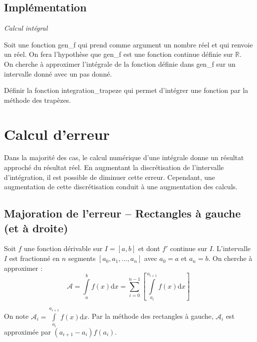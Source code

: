 \documentclass[10pt,fleqn]{article} %
\begin{document}
\begin{minipage}[c]{.38\linewidth}
\end{minipage}

\subsection{Implémentation}
\begin{exemple}
\textit{Calcul intégral}

Soit une fonction \textsf{gen\_f} qui prend comme argument un nombre réel et qui renvoie un réel. On fera l'hypothèse que \textsf{gen\_f} est une fonction continue définie sur $\mathbb{R}$. On cherche à approximer l'intégrale de la fonction définie dans \textsf{gen\_f} sur un intervalle donné avec un pas donné. 

Définir la fonction \textsf{integration\_trapeze} qui permet d'intégrer une fonction par la méthode des trapèzes.

\end{exemple}

\section{Calcul d'erreur}
Dans la majorité des cas, le calcul numérique d'une intégrale donne un résultat approché du résultat réel. En augmentant la discrétisation de l'intervalle d'intégration, il est possible de diminuer cette erreur. Cependant, une augmentation de cette discrétisation conduit à une augmentation des calculs. 


\subsection{Majoration de l'erreur -- Rectangles à gauche (et à droite)}
Soit $f$ une fonction dérivable sur $I=[a,b]$ et dont $f'$ continue sur $I$. L'intervalle $I$ est fractionné en $n$ segments $[a_0, a_1, ..., a_n]$ avec $a_0 = a$ et $a_n=b$. On cherche à approximer :
$$
\mathcal{A}=\int\limits_a^{b}f(x)\mathrm{d}x =  \sum\limits_{i=0}^{n-1} \left[\int\limits_{a_i}^{a_{i+1}}f(x)\mathrm{d}x \right]
$$

On note $\mathcal{A}_i = \int\limits_{a_i}^{a_{i+1}}f(x)\mathrm{d}x $. Par la méthode des rectangles à gauche, $\mathcal{A}_i$ est approximée par $\left(a_{i+1}-a_{i}\right) f(a_i) $. 
\end{document}
